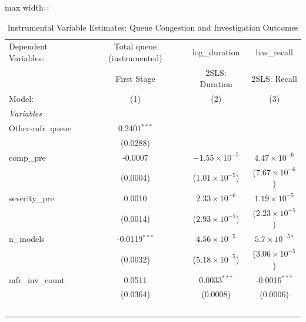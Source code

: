 \begin{table}[htbp]
   \caption{\label{tab:iv} Instrumental Variable Estimates: Queue Congestion and Investigation Outcomes}
   \centering
   \begin{adjustbox}{max width=\textwidth}
   \begin{tabular}{lccc}
      \tabularnewline \midrule \midrule
      Dependent Variables:                           & Total queue (instrumented) & log\_duration           & has\_recall\\   
                                                     & First Stage                & 2SLS: Duration          & 2SLS: Recall \\   
      Model:                                         & (1)                        & (2)                     & (3)\\  
      \midrule
      \emph{Variables}\\
      Other-mfr. queue                               & 0.2401$^{***}$             &                         &   \\   
                                                     & (0.0288)                   &                         &   \\   
      comp\_pre                                      & -0.0007                    & $-1.55\times 10^{-5}$   & $4.47\times 10^{-6}$\\    
                                                     & (0.0004)                   & ($1.01\times 10^{-5}$)  & ($7.67\times 10^{-6}$)\\    
      severity\_pre                                  & 0.0010                     & $2.33\times 10^{-6}$    & $1.19\times 10^{-5}$\\    
                                                     & (0.0014)                   & ($2.93\times 10^{-5}$)  & ($2.23\times 10^{-5}$)\\    
      n\_models                                      & -0.0119$^{***}$            & $4.56\times 10^{-5}$    & $5.7\times 10^{-5}$$^{*}$\\    
                                                     & (0.0032)                   & ($5.18\times 10^{-5}$)  & ($3.06\times 10^{-5}$)\\    
      mfr\_inv\_count                                & 0.0511                     & 0.0033$^{***}$          & -0.0016$^{***}$\\   
                                                     & (0.0364)                   & (0.0008)                & (0.0006)\\   
$$
\end{tabular}
\end{adjustbox}
\end{table}
